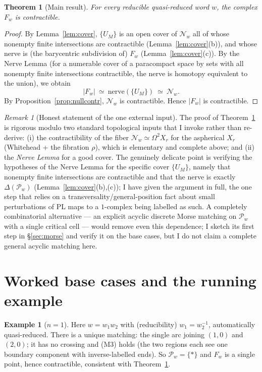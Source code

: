\documentclass[11pt]{article}
\newtheorem{theorem}{Theorem}
\theoremstyle{definition}
\newtheorem{example}{Example}
\theoremstyle{remark}
\newtheorem{remark}{Remark}
\newcommand{\rose}{X_r}
\begin{document}
\begin{theorem}[Main result]\label{thm:main}
For every reducible quasi-reduced word $w$, the complex $F_w$ is contractible.
\end{theorem}

\begin{proof}
By Lemma~\ref{lem:cover}, $\{U_M\}$ is an open cover of $\mathcal N_w$ all of
whose nonempty finite intersections are contractible (Lemma~\ref{lem:cover}(b)),
and whose nerve is (the barycentric subdivision of) $F_w$
(Lemma~\ref{lem:cover}(c)). By the Nerve Lemma (for a numerable cover of a
paracompact space by sets with all nonempty finite intersections contractible,
the nerve is homotopy equivalent to the union), we obtain
\[
|F_w|\ \simeq\ \mathrm{nerve}(\{U_M\})\ \simeq\ \mathcal N_w .
\]
By Proposition~\ref{prop:nullcontr}, $\mathcal N_w$ is contractible. Hence
$|F_w|$ is contractible.
\end{proof}

\begin{remark}[Honest statement of the one external input]\label{rem:gap}
The proof of Theorem~\ref{thm:main} is rigorous modulo two standard topological
inputs that I invoke rather than re-derive: (i) the contractibility of the fiber
$\mathcal N_w\simeq\Omega^2\rose$ for the aspherical $\rose$ (Whitehead + the
fibration $\rho$), which is elementary and complete above; and (ii) the
\emph{Nerve Lemma} for a good cover. The genuinely delicate point is verifying
the hypotheses of the Nerve Lemma for the specific cover $\{U_M\}$, namely that
nonempty finite intersections are contractible and that the nerve is exactly
$\Delta(\mathcal P_w)$ (Lemma~\ref{lem:cover}(b),(c)); I have given the argument
in full, the one step that relies on a transversality/general-position fact about
small perturbations of PL maps to a $1$-complex being labelled as such. A
completely combinatorial alternative --- an explicit acyclic discrete Morse
matching on $\mathcal P_w$ with a single critical cell --- would remove even this
dependence; I sketch its first step in \S\ref{sec:morse} and verify it on the
base cases, but I do not claim a complete general acyclic matching here.
\end{remark}

\section{Worked base cases and the running example}\label{sec:base}

\begin{example}[$n=1$]\label{ex:n1}
Here $w=w_1w_2$ with (reducibility) $w_1=w_2^{-1}$, automatically quasi-reduced.
There is a unique matching: the single arc joining $(1,0)$ and $(2,0)$; it has no
crossing and (M3) holds (the two regions each see one boundary component with
inverse-labelled ends). So $\mathcal P_w=\{\ast\}$ and $F_w$ is a single point,
hence contractible, consistent with Theorem~\ref{thm:main}.
\end{example}
\end{document}
